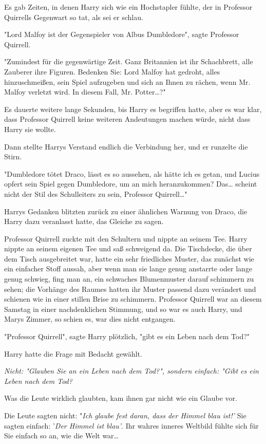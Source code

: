 {Es gab Zeiten, in denen Harry sich wie ein Hochstapler fühlte, der in Professor Quirrells Gegenwart so tat, als sei er schlau.

"Lord Malfoy ist der Gegenspieler von Albus Dumbledore", sagte Professor Quirrell.

"Zumindest für die gegenwärtige Zeit. Ganz Britannien ist ihr Schachbrett, alle Zauberer ihre Figuren. Bedenken Sie: Lord Malfoy hat gedroht, alles hinzuschmeißen, sein Spiel aufzugeben und sich an Ihnen zu rächen, wenn Mr. Malfoy verletzt wird. In diesem Fall, Mr. Potter…?"

Es dauerte weitere lange Sekunden, bis Harry es begriffen hatte, aber es war klar, dass Professor Quirrell keine weiteren Andeutungen machen würde, nicht dass Harry sie wollte.

Dann stellte Harrys Verstand endlich die Verbindung her, und er runzelte die Stirn.

"Dumbledore tötet Draco, lässt es so aussehen, als hätte ich es getan, und Lucius opfert sein Spiel gegen Dumbledore, um an mich heranzukommen? Das… scheint nicht der Stil des Schulleiters zu sein, Professor Quirrell…"

Harrys Gedanken blitzten zurück zu einer ähnlichen Warnung von Draco, die Harry dazu veranlasst hatte, das Gleiche zu sagen.

Professor Quirrell zuckte mit den Schultern und nippte an seinem Tee. Harry nippte an seinem eigenen Tee und saß schweigend da. Die Tischdecke, die über dem Tisch ausgebreitet war, hatte ein sehr friedliches Muster, das zunächst wie ein einfacher Stoff aussah, aber wenn man sie lange genug anstarrte oder lange genug schwieg, fing man an, ein schwaches Blumenmuster darauf schimmern zu sehen; die Vorhänge des Raumes hatten ihr Muster passend dazu verändert und schienen wie in einer stillen Brise zu schimmern. Professor Quirrell war an diesem Samstag in einer nachdenklichen Stimmung, und so war es auch Harry, und Marys Zimmer, so schien es, war dies nicht entgangen.

"Professor Quirrell", sagte Harry plötzlich, "gibt es ein Leben nach dem Tod?"

Harry hatte die Frage mit Bedacht gewählt.

\emph{Nicht: "Glauben Sie an ein Leben nach dem Tod?", sondern einfach: "Gibt es ein Leben nach dem Tod?}

Was die Leute wirklich glaubten, kam ihnen gar nicht wie ein Glaube vor.

Die Leute sagten nicht: "\emph{Ich glaube fest daran, dass der Himmel blau ist!'} Sie sagten einfach: '\emph{Der Himmel ist blau'}. Ihr wahres inneres Weltbild fühlte sich für Sie einfach so an, wie die Welt war…

}
